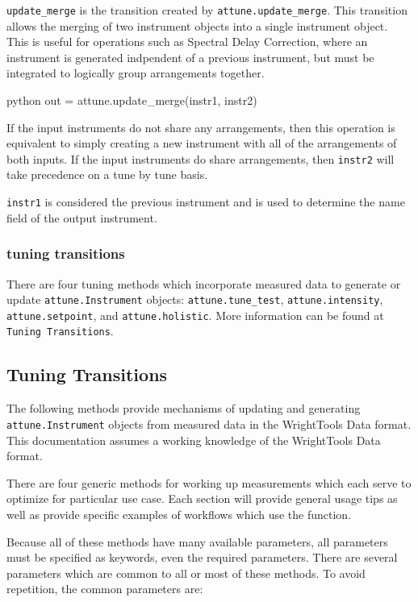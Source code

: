 \texttt{update\_merge} is the transition created by
\texttt{attune.update\_merge}. This transition allows the merging of two
instrument objects into a single instrument object. This is useful for
operations such as Spectral Delay Correction, where an instrument is
generated indpendent of a previous instrument, but must be integrated to
logically group arrangements together.

\begin{codefragment}{python}
out = attune.update_merge(instr1, instr2)
\end{codefragment}

If the input instruments do not share any arrangements, then this
operation is equivalent to simply creating a new instrument with all of
the arrangements of both inputs. If the input instruments do share
arrangements, then \texttt{instr2} will take precedence on a tune by
tune basis.

\texttt{instr1} is considered the previous instrument and is used to
determine the name field of the output instrument.

\hypertarget{tuning-transitions}{%
\subsubsection{tuning transitions}\label{tuning-transitions}}

There are four tuning methods which incorporate measured data to
generate or update \texttt{attune.Instrument} objects:
\texttt{attune.tune\_test}, \texttt{attune.intensity},
\texttt{attune.setpoint}, and \texttt{attune.holistic}. More information
can be found at \texttt{Tuning\ Transitions}.

\hypertarget{tuningux20transitions}{%
\subsection{Tuning Transitions}\label{tuningux20transitions}}

The following methods provide mechanisms of updating and generating
\texttt{attune.Instrument} objects from measured data in the
WrightTools Data
format. This documentation assumes a working knowledge of the
WrightTools Data format.

There are four generic methods for working up measurements which each
serve to optimize for particular use case. Each section will provide
general usage tips as well as provide specific examples of workflows
which use the function.

Because all of these methods have many available parameters, all
parameters must be specified as keywords, even the required parameters.
There are several parameters which are common to all or most of these
methods. To avoid repetition, the common parameters are:

